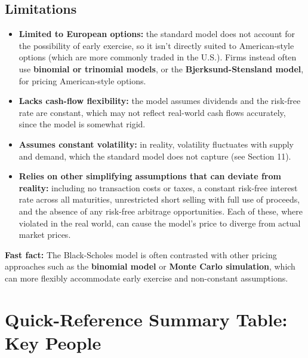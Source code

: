 \documentclass[12pt,openany]{book}
\theoremstyle{definition}
\theoremstyle{remark}
\begin{document}
\subsection{Limitations}

\begin{itemize}
\item \textbf{Limited to European options:} the standard model does not account for the possibility of early exercise, so it isn't directly suited to American-style options (which are more commonly traded in the U.S.). Firms instead often use \textbf{binomial or trinomial models}, or the \textbf{Bjerksund-Stensland model}, for pricing American-style options.


\item \textbf{Lacks cash-flow flexibility:} the model assumes dividends and the risk-free rate are constant, which may not reflect real-world cash flows accurately, since the model is somewhat rigid.


\item \textbf{Assumes constant volatility:} in reality, volatility fluctuates with supply and demand, which the standard model does not capture (see Section 11).


\item \textbf{Relies on other simplifying assumptions that can deviate from reality:} including no transaction costs or taxes, a constant risk-free interest rate across all maturities, unrestricted short selling with full use of proceeds, and the absence of any risk-free arbitrage opportunities. Each of these, where violated in the real world, can cause the model's price to diverge from actual market prices.


\end{itemize}

\textbf{Fast fact:} The Black-Scholes model is often contrasted with other pricing approaches such as the \textbf{binomial model} or \textbf{Monte Carlo simulation}, which can more flexibly accommodate early exercise and non-constant assumptions.

\section{Quick-Reference Summary Table: Key People}
\end{document}
